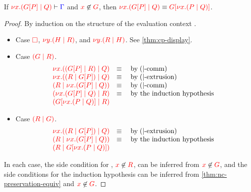 \begin{lemma}\label{thm:nc-display-1}
  If $\seq[{ \tm{\cpCut{x}{\cpPlug{G}{P}}{Q}} }]{ \Gamma }$ and
  $\notFreeIn{x}{G}$, then $\tm{\cpCut{x}{\cpPlug{G}{P}}{Q}} \equiv
  \tm{\cpPlug{G}{\cpCut{x}{P}{Q}}}$.
\end{lemma}
\begin{proof}
  By induction on the structure of the evaluation context .
  \begin{itemize}
  \item
    Case $\tm{\Box}$, $\tm{\cpCut{y}{H}{R}}$, and $\tm{\cpCut{y}{R}{H}}$. See \cref{thm:cp-display}.
  \item
    Case $\tm{\ncPool{G}{R}}$.
    \[\!
      \begin{array}{ll}
        \tm{\cpCut{x}{\ncPool{\cpPlug{G}{P}}{R}}{Q}} & \equiv \quad \text{by} \; \ncEquivPoolComm \\
        \tm{\cpCut{x}{\ncPool{R}{\cpPlug{G}{P}}}{Q}} & \equiv \quad \text{by} \; \ncRedKappaPool \\
        \tm{\ncPool{R}{\cpCut{x}{\cpPlug{G}{P}}{Q}}} & \equiv \quad \text{by} \; \ncEquivPoolComm \\
        \tm{\ncPool{\cpCut{x}{\cpPlug{G}{P}}{Q}}{R}} & \equiv \quad \text{by the induction hypothesis}\\
        \tm{\ncPool{\cpPlug{G}{\cpCut{x}{P}{Q}}}{R}} &
      \end{array}
    \]
  \item
    Case $\tm{\ncPool{R}{G}}$.
    \[\!
      \begin{array}{ll}
        \tm{\cpCut{x}{\ncPool{R}{\cpPlug{G}{P}}}{Q}} & \equiv \quad \text{by} \; \ncRedKappaPool \\
        \tm{\ncPool{R}{\cpCut{x}{\cpPlug{G}{P}}{Q}}} & \equiv \quad \text{by the induction hypothesis}\\
        \tm{\ncPool{R}{\cpPlug{G}{\cpCut{x}{P}{Q}}}} &
      \end{array}
    \]
  \end{itemize}
  In each case, the side condition for \ncRedKappaPool, $\notFreeIn{x}{R}$, can
  be inferred from $\notFreeIn{x}{G}$, and the side conditions for the induction
  hypothesis can be inferred from \cref{thm:nc-preservation-equiv} and
  $\notFreeIn{x}{G}$.
\end{proof}
